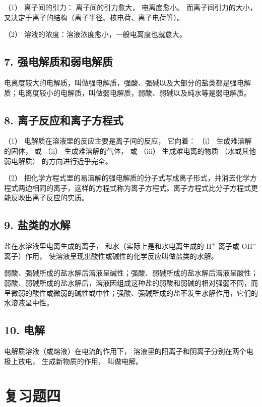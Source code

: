 （1） 离子间的引力： 离子间的引力愈大， 电离度愈小。
而离子间引力的大小，
又决定于离子的结构（离子半径、核电荷、离子电荷等）。

（2） 溶液的浓度：溶液浓度愈小，一般电离度也就愈大。

\subsection{7. 强电解质和弱电解质}

电离度较大的电解质，叫做强电解质，强酸、强碱以及大部分的盐类都是强电解质；电离度较小的电解质，叫做弱电解质，弱酸、弱碱以及纯水等是弱电解质。

\subsection{8. 离子反应和离子方程式}

（1） 电解质在溶液里的反应主要是离子间的反应， 它向着： （i）
生成难溶解的固体， 或 （ii） 生成难溶解的气体， 或 （iii）
生成难电离的物质 （水或其他弱电解质） 的方向进行近乎完全。

（2）
把化学方程式里的易溶解的强电解质的分子式写成离子形式，并消去化学方程式两边相同的离子，这样的方程式称为离子方程式。离子方程式比分子方程式更能反映出离子反应的实质。

\subsection{9. 盐类的水解}

盐在水溶液里电离生成的离子， 和水（实际上是和水电离生成的
\(\mathrm{H}^{+}\) 离子或 \(\mathrm{OH}^{-}\) 离子）作用，
使溶液呈现出酸性或碱性的化学反应叫做盐类的水解。

弱酸、强碱所成的盐水解后溶液呈碱性；强酸、弱碱所成的盐水解后溶液呈酸性；弱酸、弱碱所成的盐水解后，溶液因组成这种盐的弱酸和弱碱的相对强弱不同，而呈微弱的酸性或微弱的碱性或中性；强酸、强碱所成的盐不发生水解作用，它们的水溶液呈中性。

\subsection{10. 电解}

电解质溶液（或熔液）在电流的作用下，
溶液里的阳离子和阴离子分别在两个电极上放电， 生成新物质的作用，
叫做电解。

\section{复习题四}

